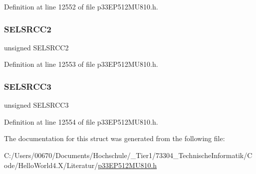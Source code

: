 Definition at line 12552 of file p33\+E\+P512\+M\+U810.\+h.

\mbox{\label{structtag_c_m3_m_s_k_s_r_c_b_i_t_s_a7cf665e6530692c6a4905ad1e53934ad}} 
\subsubsection{\texorpdfstring{S\+E\+L\+S\+R\+C\+C2}{SELSRCC2}}
{\footnotesize\ttfamily unsigned S\+E\+L\+S\+R\+C\+C2}



Definition at line 12553 of file p33\+E\+P512\+M\+U810.\+h.

\mbox{\label{structtag_c_m3_m_s_k_s_r_c_b_i_t_s_a232ce18f72b62eef1f6ac40a0c4b7f31}} 
\subsubsection{\texorpdfstring{S\+E\+L\+S\+R\+C\+C3}{SELSRCC3}}
{\footnotesize\ttfamily unsigned S\+E\+L\+S\+R\+C\+C3}



Definition at line 12554 of file p33\+E\+P512\+M\+U810.\+h.



The documentation for this struct was generated from the following file\+:\begin{DoxyCompactItemize}
\item 
C\+:/\+Users/00670/\+Documents/\+Hochschule/\+\_\+\+Tier1/73304\+\_\+\+Technische\+Informatik/\+Code/\+Hello\+World4.\+X/\+Literatur/\hyperlink{p33_e_p512_m_u810_8h}{p33\+E\+P512\+M\+U810.\+h}\end{DoxyCompactItemize}
